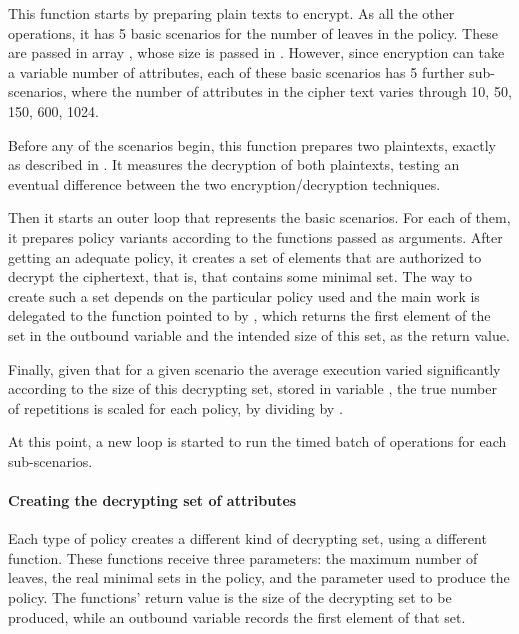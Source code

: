 \documentclass{article}
\begin{document}
This function starts by preparing plain texts to encrypt. As all the other operations, it has 5 basic scenarios for the number of leaves in the policy. These are passed in array , whose size is passed in . However, since encryption can take a variable number of attributes, each of these basic scenarios has 5 further sub-scenarios, where the number of attributes in the cipher text varies through 10, 50, 150, 600, 1024.

Before any of the scenarios begin, this function prepares two plaintexts, exactly as described in . It measures the decryption of both plaintexts, testing an eventual difference between the two encryption/decryption techniques.

Then it starts an outer loop that represents the basic scenarios. For each of them, it prepares policy variants according to the functions passed as arguments. After getting an adequate policy, it creates a set of elements that are authorized to decrypt the ciphertext, that is, that contains some minimal set. The way to create such a set depends on the particular policy used and the main work is delegated to the function pointed to by , which returns the first element of the set in the outbound variable  and the intended size of this set, as the return value.

Finally, given that for a given scenario the average execution varied significantly according to the size of this decrypting set, stored in variable , the true number of repetitions is scaled for each policy, by dividing  by .

At this point, a new loop is started to run the timed batch of operations for each sub-scenarios.

\paragraph{Creating the decrypting set of attributes}

Each type of policy creates a different kind of decrypting set, using a different function. These functions receive three parameters: the maximum number of leaves, the real minimal sets in the policy, and the parameter  used to produce the policy. The functions' return value is the size of the decrypting set to be produced, while an outbound variable records the first element of that set. 
\end{document}

